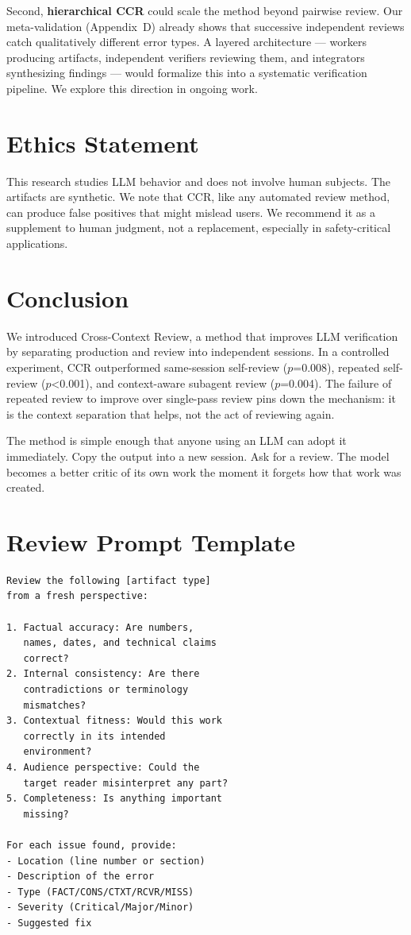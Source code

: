 \documentclass[11pt]{article}
\begin{document}
Second, \textbf{hierarchical CCR} could scale the method beyond pairwise review. Our meta-validation (Appendix~D) already shows that successive independent reviews catch qualitatively different error types. A layered architecture --- workers producing artifacts, independent verifiers reviewing them, and integrators synthesizing findings --- would formalize this into a systematic verification pipeline. We explore this direction in ongoing work.

\section{Ethics Statement}

This research studies LLM behavior and does not involve human subjects. The artifacts are synthetic. We note that CCR, like any automated review method, can produce false positives that might mislead users. We recommend it as a supplement to human judgment, not a replacement, especially in safety-critical applications.

\section{Conclusion}

We introduced Cross-Context Review, a method that improves LLM verification by separating production and review into independent sessions. In a controlled experiment, CCR outperformed same-session self-review ($p$=0.008), repeated self-review ($p$<0.001), and context-aware subagent review ($p$=0.004). The failure of repeated review to improve over single-pass review pins down the mechanism: it is the context separation that helps, not the act of reviewing again.

The method is simple enough that anyone using an LLM can adopt it immediately. Copy the output into a new session. Ask for a review. The model becomes a better critic of its own work the moment it forgets how that work was created.



\appendix

\section{Review Prompt Template}

\begin{verbatim}
Review the following [artifact type]
from a fresh perspective:

1. Factual accuracy: Are numbers,
   names, dates, and technical claims
   correct?
2. Internal consistency: Are there
   contradictions or terminology
   mismatches?
3. Contextual fitness: Would this work
   correctly in its intended
   environment?
4. Audience perspective: Could the
   target reader misinterpret any part?
5. Completeness: Is anything important
   missing?

For each issue found, provide:
- Location (line number or section)
- Description of the error
- Type (FACT/CONS/CTXT/RCVR/MISS)
- Severity (Critical/Major/Minor)
- Suggested fix
\end{verbatim}
\end{document}
